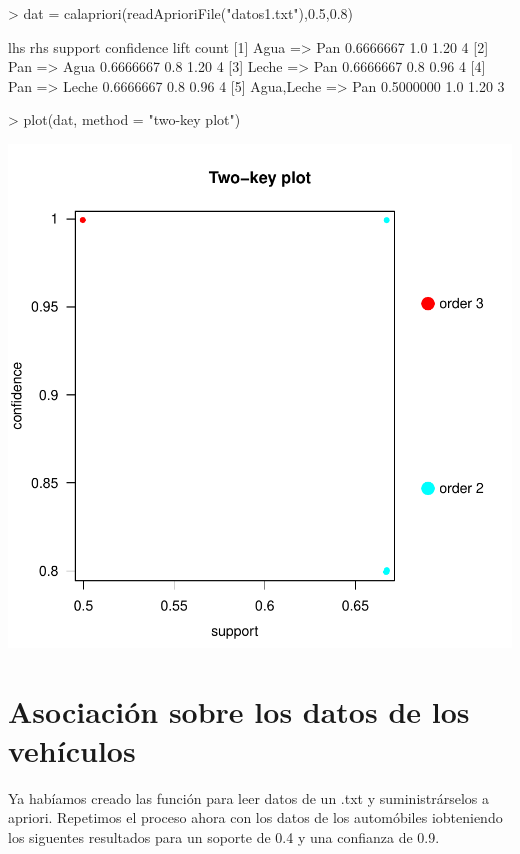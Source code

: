 \documentclass [a4paper] {article}
\begin{document}
\begin{Schunk}
\begin{Sinput}
> dat = calapriori(readAprioriFile("datos1.txt"),0.5,0.8)
\end{Sinput}
\begin{Soutput}
    lhs             rhs     support   confidence lift count
[1] {Agua}       => {Pan}   0.6666667 1.0        1.20 4    
[2] {Pan}        => {Agua}  0.6666667 0.8        1.20 4    
[3] {Leche}      => {Pan}   0.6666667 0.8        0.96 4    
[4] {Pan}        => {Leche} 0.6666667 0.8        0.96 4    
[5] {Agua,Leche} => {Pan}   0.5000000 1.0        1.20 3    
\end{Soutput}
\end{Schunk}
\begin{center}
\begin{Schunk}
\begin{Sinput}
> plot(dat, method = "two-key plot")
\end{Sinput}
\end{Schunk}
\includegraphics{entrega-grafica_apriori}
\end{center}

\section{Asociación sobre los datos de los vehículos}
Ya habíamos creado las función para leer datos de un .txt y suministrárselos a apriori.
Repetimos el proceso ahora con los datos de los automóbiles iobteniendo los siguentes resultados para un soporte de 0.4 y una confianza de 0.9.
\end{document}
